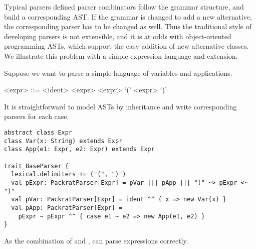 
Typical parsers defined parser combinators follow the grammar
structure, and build a corresponding AST. If the grammar is changed to
add a new alternative, the corresponding parser has to be changed as
well. Thus the traditional style of developing parsers is not
extensible, and it is at odds with object-oriented programming ASTs,
which support the easy addition of new alternative classes. We
illustrate this problem with a simple expression language and extension.

Suppose we want to parse a simple language of variables and
applications.

\setlength{\grammarindent}{5em}
\begin{grammar}
<expr> ::= <ident>
    \alt <expr> <expr>
    \alt `(' <expr> `)'
\end{grammar}

It is straightforward to model ASTs by inheritance and write corresponding parsers for each case. 

\begin{lstlisting}
abstract class Expr
class Var(x: String) extends Expr
class App(e1: Expr, e2: Expr) extends Expr

trait BaseParser {
  lexical.delimiters += ("(", ")")
  val pExpr: PackratParser[Expr] = pVar ||| pApp ||| "(" ~> pExpr <~ ")"
  val pVar: PackratParser[Expr] = ident ^^ { x => new Var(x) }
  val pApp: PackratParser[Expr] =
    pExpr ~ pExpr ^^ { case e1 ~ e2 => new App(e1, e2) }
}
\end{lstlisting}

As the combination of  and ,  can parse expressions correctly.

